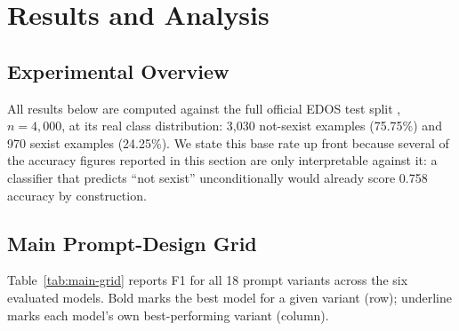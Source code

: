 \section{Results and Analysis}
\label{sec:results}

\subsection{Experimental Overview}
\label{sec:results:overview}

All results below are computed against the full official EDOS test split
\cite{kirk2023semeval}, $n=4{,}000$, at its real class distribution:
3{,}030 not-sexist examples (75.75\%) and 970 sexist examples (24.25\%).
We state this base rate up front because several of the accuracy figures
reported in this section are only interpretable against it: a
classifier that predicts ``not sexist'' unconditionally would already
score 0.758 accuracy by construction.

\subsection{Main Prompt-Design Grid}
\label{sec:results:grid}

Table~\ref{tab:main-grid} reports F1 for all 18 prompt variants across
the six evaluated models. Bold marks the best model for a given variant
(row); underline marks each model's own best-performing variant
(column).

